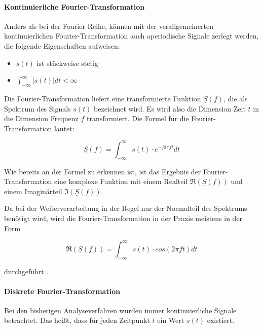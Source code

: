 \paragraph{Kontinuierliche Fourier-Transformation}


Anders als bei der Fourier Reihe, können mit der verallgemeinerten kontinuierlichen Fourier-Transformation auch aperiodische Signale zerlegt werden, die folgende Eigenschaften aufweisen:

\begin{itemize}
    \item $s(t)$ ist stückweise stetig
    \item $\int_{-\infty}^{\infty} |s(t)| dt < \infty$
\end{itemize}

Die Fourier-Transformation liefert eine transformierte Funktion $\underline{S}(f)$, die als Spektrum des Signals $s(t)$ bezeichnet wird.
Es wird also die Dimension Zeit $t$ in die Dimension Frequenz $f$ transformiert.
Die Formel für die Fourier-Transformation lautet:

\begin{equation}
    \underline{S}(f) = \int_{-\infty}^{\infty} s(t) \cdot e^{-j2\pi ft} dt
\end{equation}

Wie bereits an der Formel zu erkennen ist, ist das Ergebnis der Fourier-Transformation eine komplexe Funktion mit einem Realteil $\Re(\underline{S}(f))$ und einem Imaginärteil $\Im(\underline{S}(f))$.

Da bei der Weiterverarbeitung in der Regel nur der Normalteil des Spektrums benötigt wird, wird die Fourier-Transformation in der Praxis meistens in der Form

\begin{equation}
    \Re(\underline{S}(f)) = \int_{-\infty}^{\infty} s(t) \cdot cos(2\pi ft) dt
\end{equation}

durchgeführt \autocite[vgl.][S. 350f]{picard_fourier-analyse_1996}.

\paragraph{Diskrete Fourier-Transformation}

Bei den bisherigen Analyseverfahren wurden immer kontinuierliche Signale betrachtet.
Das heißt, dass für jeden Zeitpunkt $t$ ein Wert $s(t)$ existiert.

